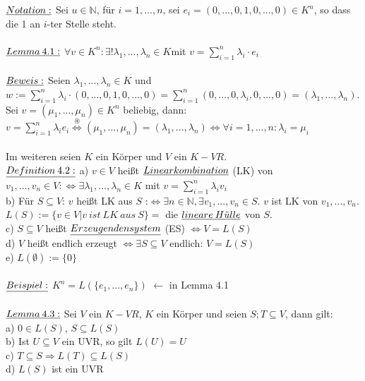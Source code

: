 \documentclass[fleqn, a4paper, 11pt]{article}
\begin{document}
$\uline{Notation:}$ Sei $u\in\mathbb{N}$, f\"ur $i=1,...,n$, sei $e_{i}=(0,...,0,1,0,...,0)\in K^{n}$, so dass die 1 an $i$-ter Stelle steht.\\
\\
$\uline{Lemma\:4.1:}$ $\forall v\in K^{n}:\exists!\lambda_{1},...,\lambda_{n}\in K$mit $v= \sum\limits_{i=1}^{n} \lambda_{i}\cdot e_{i}$\\
\\
$\uline{Beweis:}$ Seien $\lambda_{1},...,\lambda_{n}\in K$ und $w:=\sum\limits_{i=1}^{n}\lambda_{i}\cdot(0,...,0,1,0,...,0)=\sum\limits_{i=1}^{n}(0,...,0,\lambda_{i},0,...,0)=(\lambda_{1},...,\lambda_{n})$. Sei $v=(\mu_{1},...,\mu_{n})\in K^{n}$ beliebig, dann: $v=\sum\limits_{i=1}^{n}\lambda_{i}e_{i}\stackrel{\circledast}{\Leftrightarrow}(\mu_{1},...,\mu_{n})=(\lambda_{1},...,\lambda_{n})\Leftrightarrow \forall i=1,...,n: \lambda_{i}=\mu_{i}$\\
\\
Im weiteren seien $K$ ein K\"orper und $V$ ein $K-VR$.\\
$\uline{Definition\:4.2:}$ a) $v\in V$ hei\ss{}t $\uline{Linearkombination}$ (LK) von $v_{1},...,v_{n}\in V:\Leftrightarrow \exists\lambda_{1},...,\lambda_{n}\in K$ mit $v=\sum\limits_{i=1}^{n}\lambda_{i}v_{i}$\\
b) F\"ur $S\subseteq V$: $v$ hei\ss{}t LK aus $S$ :$\Leftrightarrow\exists n\in\mathbb{N},\exists v_{1},...,v_{n}\in S$. $v$ ist LK von $v_{1},...,v_{n}$. $L(S):=\{v\in V|v\:ist\:LK\:aus\:S\}=$ die $\uline{lineare\:H\ddot{u}lle}$ von $S$.\\
c) $S\subseteq V$ hei\ss{}t $\uline{Erzeugendensystem}$ (ES) $\Leftrightarrow V=L(S)$\\
d) $V$ hei\ss{}t endlich erzeugt $\Leftrightarrow \exists S\subseteq V$ endlich: $V=L(S)$\\
e) $L(\emptyset):=\{0\}$\\
\\
$\uline{Beispiel:}$ $K^{n}=L(\{e_{1},...,e_{n}\})$ $\leftarrow$ in Lemma 4.1\\
\\
$\uline{Lemma\:4.3:}$ Sei $V$ ein $K-VR$, $K$ ein K\"orper und seien $S;T\subseteq V$, dann gilt:\\
a) $0\in L(S)$, $S\subseteq L(S)$\\
b) Ist $U\subseteq V$ ein UVR, so gilt $L(U)=U$\\
c) $T\subseteq S\Rightarrow L(T)\subseteq L(S)$\\
d) $L(S)$ ist ein UVR\\
\end{document}
